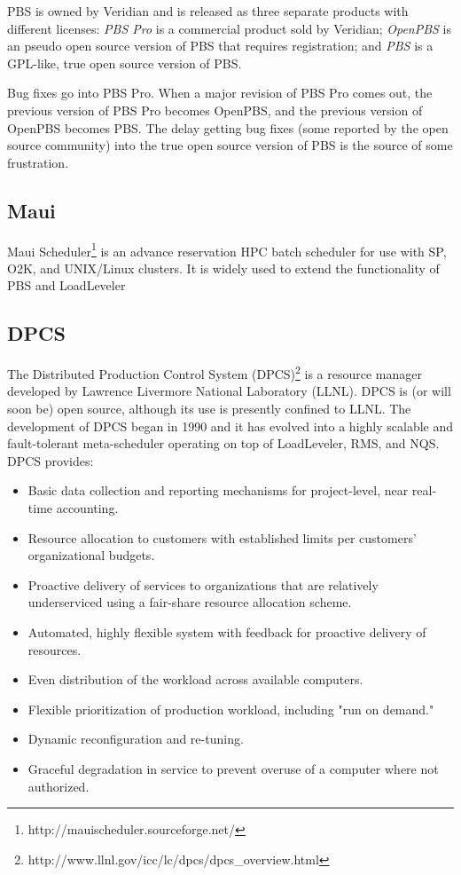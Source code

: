PBS is owned by Veridian and is released as three separate products with
different licenses: {\em PBS Pro} is a commercial product sold by Veridian;
{\em OpenPBS} is an pseudo open source version of PBS that requires 
registration; and
{\em PBS} is a GPL-like, true open source version of PBS.

Bug fixes go into PBS Pro.  When a major revision of PBS Pro comes out,
the previous version of PBS Pro becomes OpenPBS, and the previous version
of OpenPBS becomes PBS.  The delay getting bug fixes (some reported by the
open source community) into the true open source version of PBS is the source
of some frustration.

\subsection{Maui}

Maui Scheduler\footnote{http://mauischeduler.sourceforge.net/}
is an advance reservation HPC batch scheduler for use with SP, 
O2K, and UNIX/Linux clusters. It is widely used to extend the 
functionality of PBS and LoadLeveler

\subsection{DPCS}

The Distributed Production Control System (DPCS)\footnote{
http://www.llnl.gov/icc/lc/dpcs/dpcs\_overview.html}
is a resource manager developed by Lawrence Livermore National Laboratory (LLNL). 
DPCS is (or will soon be) open source, although its use is presently 
confined to LLNL. The development of DPCS began in 1990 and it has 
evolved into a highly scalable and fault-tolerant meta-scheduler 
operating on top of LoadLeveler, RMS, and NQS. DPCS provides: 
\begin{itemize}
\item Basic data collection and reporting mechanisms for project-level, 
      near real-time accounting.
\item Resource allocation to customers with established limits per 
      customers' organizational budgets. 
\item Proactive delivery of services to organizations that are relatively 
      underserviced using a fair-share resource allocation scheme.
\item Automated, highly flexible system with feedback for proactive delivery 
      of resources.
\item Even distribution of the workload across available computers.
\item Flexible prioritization of production workload, including "run on demand."
\item Dynamic reconfiguration and re-tuning.
\item Graceful degradation in service to prevent overuse of a computer where 
      not authorized.
\end{itemize}

